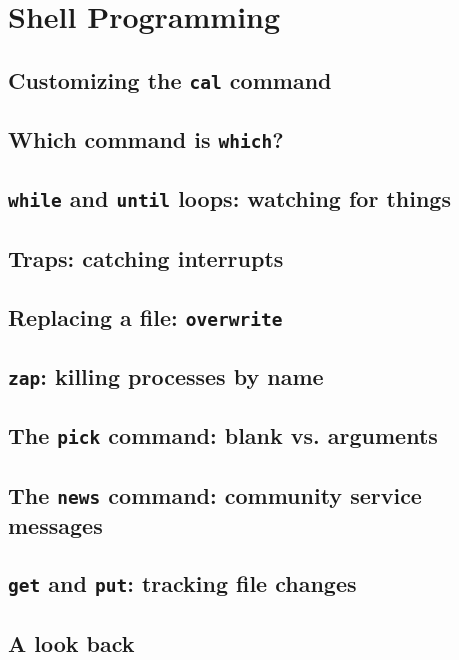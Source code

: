 \chapter{Shell Programming}
\label{chap:shell_programming}
\section{Customizing the \texttt{cal} command}
\section{Which command is \texttt{which}?}
\section{\texttt{while} and \texttt{until} loops: watching for things}
\section{Traps: catching interrupts}
\section{Replacing a file: \texttt{overwrite}}
\section{\texttt{zap}: killing processes by name}
\section{The \texttt{pick} command: blank vs. arguments}
\section{The \texttt{news} command: community service messages}
\section{\texttt{get} and \texttt{put}: tracking file changes}
\section{A look back}
